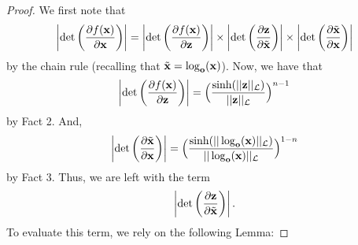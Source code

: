 \begin{proof}
We first note that 
\begin{equation}
\left|\textnormal{det}\left(\frac{\partial f(\mathbf{x})}{\partial \mathbf{x}}\right)\right| = \left|\textrm{det}\left(\frac{\partial f(\mathbf{x})}{\partial \mathbf{z}}\right)\right| \times \left|\textrm{det}\left(\frac{\partial \mathbf{z}}{\partial \tilde{\mathbf{x}}}\right)\right| \times \left|\textrm{det}\left(\frac{\partial \tilde{\mathbf{x}}}{\partial \mathbf{x}}\right)\right| 
\end{equation}
by the chain rule (recalling that $\tilde{\mathbf{x}} = \log_{\mathbf{o}}(\mathbf{x})$).
Now, we have that 
\begin{equation}
\left|\textrm{det}\left(\frac{\partial f(\mathbf{x})}{\partial \mathbf{z}}\right)\right| = \Big(\frac{\sinh(||\mathbf{z}||_{\mathcal{L}})}{||\mathbf{z}||_{\mathcal{L}}}\Big)^{n-1}
\end{equation}
by Fact 2.
And, 
\begin{equation}
\left|\textrm{det}\left(\frac{\partial \tilde{\mathbf{x}}}{\partial \mathbf{x}}\right)\right| = \Big(\frac{\sinh(||\log_{\textbf{o}}(\textbf{x})||_{\mathcal{L}})}{||\log_{\textbf{o}}(\textbf{x})||_{\mathcal{L}}}\Big)^{1-n}
\end{equation}
by Fact 3.
Thus, we are left with the term
$$
\left|\textrm{det}\left(\frac{\partial \mathbf{z}}{\partial \tilde{\mathbf{x}}}\right)\right|.
$$
To evaluate this term, we rely on the following Lemma:


\end{proof}
